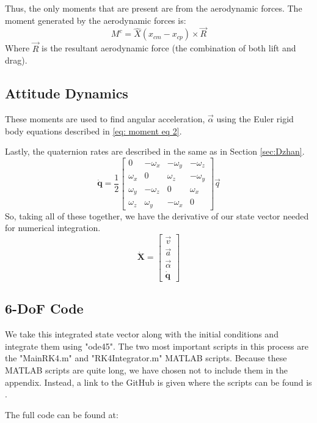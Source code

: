 \documentclass[12pt]{report}
\begin{document}
Thus, the only moments that are present are from the aerodynamic forces. The moment generated by the aerodynamic forces is:
\begin{equation}
    M^c=\hat{X}(x_{cm}-x_{cp})\times \vec{R}
\end{equation}
Where $\vec{R}$ is the resultant aerodynamic force (the combination of both lift and drag).

\subsection{Attitude Dynamics}
These moments are used to find angular acceleration, $\vec{\alpha}$ using the Euler rigid body equations described in \eqref{eq: moment eq 2}. 

Lastly, the quaternion rates are described in the same as in Section \ref{sec:Dzhan}.
\begin{equation}
    \dot{\textbf{q}}=\frac{1}{2}\begin{bmatrix}
        0&-\omega_x&-\omega_y&-\omega_z\\
        \omega_x&0&\omega_z&-\omega_y\\
        \omega_y&-\omega_z&0&\omega_x\\
        \omega_z&\omega_y&-\omega_x&0
    \end{bmatrix}\vec{q}
\end{equation}
So, taking all of these together, we have the derivative of our \gls{state vector} needed for numerical integration.
\begin{equation}
    \dot{\textbf{X}}=\begin{bmatrix}
        \vec{v}\\\vec{a}\\\vec{\alpha}\\\dot{\textbf{q}}
    \end{bmatrix}
\end{equation}
\subsection{6-DoF Code}
We take this integrated state vector along with the initial conditions and integrate them using "ode45". The two most important scripts in this process are the "MainRK4.m" and "RK4Integrator.m" MATLAB scripts. Because these MATLAB scripts are quite long, we have chosen not to include them in the appendix. Instead, a link to the GitHub is given where the scripts can be found is .

The full code can be found at: %
\end{document}
